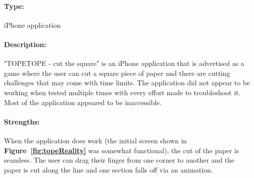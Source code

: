 \documentclass[11pt]{article}
\begin{document}
                \paragraph{Type:} iPhone application 

                \paragraph{Description:}
                "TOPETOPE - cut the square" is an iPhone application that is advertised as a game where the user can cut a square piece of paper and there are cutting challenges that may come with time limits. The application did not appear to be working when tested multiple times with every effort made to troubleshoot it. Most of the application appeared to be inaccessible. 
                
                \paragraph{Strengths:}
                When the application does work (the initial screen shown in \textbf{Figure~\ref{fig:topeReality}} was somewhat functional), the cut of the paper is seamless. The user can drag their finger from one corner to another and the paper is cut along the line and one section falls off via an animation.
                
\end{document}
